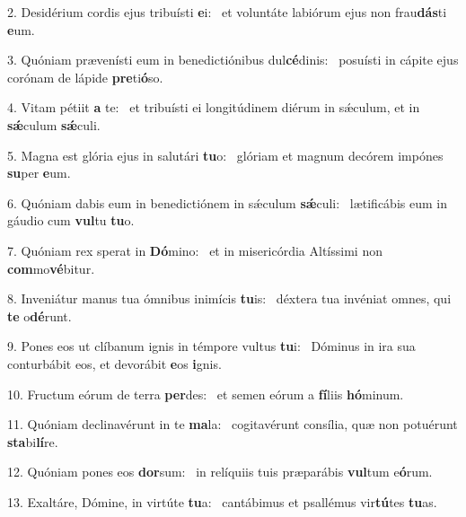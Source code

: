 2. Desidérium cordis ejus tribuísti \textbf{e}i: \ast\  et voluntáte labiórum ejus non frau\textbf{dás}ti \textbf{e}um.\

3. Quóniam prævenísti eum in benedictiónibus dul\textbf{cé}dinis: \ast\  posuísti in cápite ejus corónam de lápide \textbf{pre}ti\textbf{ó}so.\

4. Vitam pétiit \textbf{a} te: \ast\  et tribuísti ei longitúdinem diérum in sǽculum, et in \textbf{sǽ}culum \textbf{sǽ}culi.\

5. Magna est glória ejus in salutári \textbf{tu}o: \ast\  glóriam et magnum decórem impónes \textbf{su}per \textbf{e}um.\

6. Quóniam dabis eum in benedictiónem in sǽculum \textbf{sǽ}culi: \ast\  lætificábis eum in gáudio cum \textbf{vul}tu \textbf{tu}o.\

7. Quóniam rex sperat in \textbf{Dó}mino: \ast\  et in misericórdia Altíssimi non \textbf{com}mo\textbf{vé}bitur.\

8. Inveniátur manus tua ómnibus inimícis \textbf{tu}is: \ast\  déxtera tua invéniat omnes, qui \textbf{te} o\textbf{dé}runt.\

9. Pones eos ut clíbanum ignis in témpore vultus \textbf{tu}i: \ast\  Dóminus in ira sua conturbábit eos, et devorábit \textbf{e}os \textbf{i}gnis.\

10. Fructum eórum de terra \textbf{per}des: \ast\  et semen eórum a \textbf{fí}liis \textbf{hó}minum.\

11. Quóniam declinavérunt in te \textbf{ma}la: \ast\  cogitavérunt consília, quæ non potuérunt \textbf{sta}bi\textbf{lí}re.\

12. Quóniam pones eos \textbf{dor}sum: \ast\  in relíquiis tuis præparábis \textbf{vul}tum e\textbf{ó}rum.\

13. Exaltáre, Dómine, in virtúte \textbf{tu}a: \ast\  cantábimus et psallémus vir\textbf{tú}tes \textbf{tu}as.\

